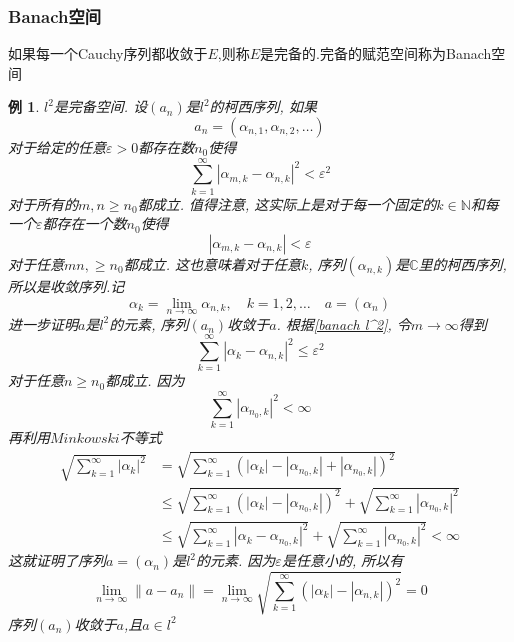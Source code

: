 \documentclass[a4paper,11pt]{article}
\theoremstyle{mystyle}
\newtheorem{example}{\hspace{2em}例}[section]
\begin{document}
\subsubsection*{Banach空间}
\begin{definition}
  如果每一个Cauchy序列都收敛于$E$,则称$E$是完备的.完备的赋范空间称为Banach空间
\end{definition}
\begin{example}\label{l^2 complete}
  $l^2$是完备空间. 设$(a_n)$是$l^2$的柯西序列, 如果
  \begin{equation*}
    a_n=(\alpha_{n,1},\alpha_{n,2},\dots)
  \end{equation*}
  对于给定的任意$\varepsilon>0$都存在数$n_0$使得
  \begin{equation*}\label{banach l^2}
    \sum_{k=1}^{\infty}|\alpha_{m,k}-\alpha_{n,k}|^2<\varepsilon^2
  \end{equation*}
  对于所有的$m,n\geq n_0$都成立. 值得注意, 这实际上是对于每一个固定的$k\in \mathbb{N}$和每一个$\varepsilon$都存在一个数$n_0$使得
  \begin{equation*}
    |\alpha_{m,k}-\alpha_{n,k}|<\varepsilon
  \end{equation*}
  对于任意$mn,\geq n_0$都成立. 这也意味着对于任意$k$, 序列$(\alpha_{n,k})$是$\mathbb{C}$里的柯西序列, 所以是收敛序列.记
  \begin{equation*}
    \alpha_k=\lim_{n\to\infty}\alpha_{n,k},\quad k=1,2,\dots\quad a=(\alpha_{n})
  \end{equation*}
  进一步证明$a$是$l^2$的元素, 序列$(a_n)$收敛于$a$. 根据\eqref{banach l^2}, 令$m\to \infty$得到
  \begin{equation*}
    \sum_{k=1}^{\infty}|\alpha_k-\alpha_{n,k}|^2\leq\varepsilon^2
  \end{equation*}
  对于任意$n\geq n_0$都成立. 因为
  \begin{equation*}
    \sum_{k=1}^{\infty}|\alpha_{n_0,k}|^2<\infty
  \end{equation*}
  再利用$Minkowski$不等式
  \begin{equation*}
  \begin{split}
     \sqrt{\sum_{k=1}^{\infty}|\alpha_k|^2}&=\sqrt{\sum_{k=1}^{\infty}(|\alpha_k|-|\alpha_{n_0,k}|+|\alpha_{n_0,k}|)^2} \\
       &\leq\sqrt{\sum_{k=1}^{\infty}(|\alpha_k|-|\alpha_{n_0,k}|)^2}+\sqrt{\sum_{k=1}^{\infty}|\alpha_{n_0,k}|^2}\\
       &\leq\sqrt{\sum_{k=1}^{\infty}|\alpha_k-\alpha_{n_0,k}|^2}+\sqrt{\sum_{k=1}^{\infty}|\alpha_{n_0,k}|^2}<\infty
  \end{split}
  \end{equation*}
  这就证明了序列$a=(\alpha_n)$是$l^2$的元素. 因为$\varepsilon$是任意小的, 所以有
  \begin{equation*}
    \lim_{n\to\infty}\|a-a_n\|=\lim_{n\to\infty}\sqrt{\sum_{k=1}^{\infty}(|\alpha_k|-|\alpha_{n,k}|)^2}=0
  \end{equation*}
  序列$(a_n)$收敛于$a$,且$a\in l^2$
\end{example}
\end{document}
